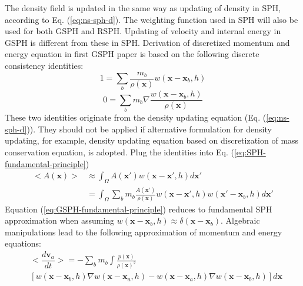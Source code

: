 The density field is updated in the same way as updating of density in SPH, according to Eq. (\ref{eq:ns-sph-d}). The weighting function used in SPH will also be used for both GSPH and RSPH. Updating of velocity and internal energy in GSPH is different from these in SPH.
Derivation of discretized momentum and energy equation in first GSPH paper \citep{inutsuka2002reformulation} is based on the following discrete consistency identities: 
\begin{equation}
1=\sum_{b} \frac{m_{b}}{\rho(\textbf{x})}w(\textbf{x} - \textbf{x}_{b}, h)
\label{eq:GSPH-basic1}
\end{equation}
\begin{equation}
0=\sum_{b} m_{b} \nabla \frac{w(\textbf{x} - \textbf{x}_{b}, h)}{\rho(\textbf{x})}
\label{eq:GSPH-basic2}
\end{equation}
These two identities originate from the density updating equation (Eq. (\ref{eq:ns-sph-d})). They should not be applied if alternative formulation for density updating, for example, density updating equation based on discretization of mass conservation equation, is adopted.
Plug the identities into Eq. (\ref{eq:SPH-fundamental-principle})
\begin{equation}
\begin{split}
<A\left(\textbf{x}\right)> 
& \approx \int_{\Omega} A\left(\textbf{x} \prime\right) w\left(\textbf{x}-\textbf{x}\prime, h\right) d\textbf{x}\prime \\
& = \int_{\Omega}  \sum_{b} m_{b} \frac{A\left(\textbf{x} \prime\right)}{\rho(\textbf{x})} w\left(\textbf{x}-\textbf{x}\prime, h\right) w(\textbf{x}\prime - \textbf{x}_{b}, h) d\textbf{x}\prime
\end{split}
\label{eq:GSPH-fundamental-principle}
\end{equation}
Equation (\ref{eq:GSPH-fundamental-principle}) reduces to fundamental SPH approximation when assuming $w(\textbf{x} - \textbf{x}_{b}, h) \approx \delta (\textbf{x} - \textbf{x}_{b})$. 
Algebraic manipulations \citep{inutsuka2002reformulation,iwasaki2011smoothed} lead to the following approximation of momentum and energy equations:
\begin{equation}
\begin{split}
&<\dfrac{d \textbf{v}_{a}}{dt}> =-\sum_{b} m_{b} \int \frac{p(\textbf{x})}{\rho(\textbf{x})^2} \\
&\left[w(\textbf{x} - \textbf{x}_b, h) \nabla w(\textbf{x} - \textbf{x}_a, h) - w(\textbf{x} - \textbf{x}_a, h) \nabla w(\textbf{x} - \textbf{x}_b, h)\right] d\textbf{x} 
\end{split}
\label{eq:gov-gsph-v-approx}
\end{equation}
